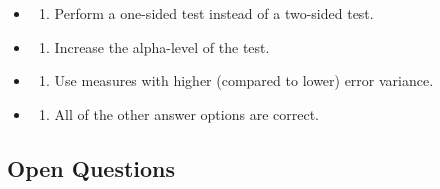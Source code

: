 \documentclass[
  letterpaper,
  DIV=11,
  numbers=noendperiod]{scrreprt}
\providecommand{\tightlist}{%
  \setlength{\itemsep}{0pt}\setlength{\parskip}{0pt}}\usepackage{longtable,booktabs,array}
\begin{document}
\begin{itemize}
\item
  \begin{enumerate}
  \def\labelenumi{(\Alph{enumi})}
  \tightlist
  \item
    Perform a one-sided test instead of a two-sided test.\\
  \end{enumerate}
\item
  \begin{enumerate}
  \def\labelenumi{(\Alph{enumi})}
  \setcounter{enumi}{1}
  \tightlist
  \item
    Increase the alpha-level of the test.\\
  \end{enumerate}
\item
  \begin{enumerate}
  \def\labelenumi{(\Alph{enumi})}
  \setcounter{enumi}{2}
  \tightlist
  \item
    Use measures with higher (compared to lower) error variance.\\
  \end{enumerate}
\item
  \begin{enumerate}
  \def\labelenumi{(\Alph{enumi})}
  \setcounter{enumi}{3}
  \tightlist
  \item
    All of the other answer options are correct.\\
  \end{enumerate}
\end{itemize}

\hypertarget{open-questions}{%
\subsection{Open Questions}\label{open-questions}}
\end{document}
